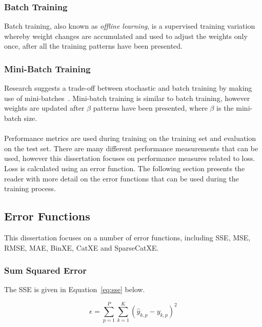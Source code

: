 \subsubsection{Batch Training}\label{sec:anns:training:batch}

Batch training, also known as \textit{offline learning}, is a supervised training variation whereby weight changes are accumulated and used to adjust the weights only once, after all the training patterns have been presented.


\subsubsection{Mini-Batch Training}\label{sec:anns:training:mini_batch}

Research suggests a trade-off between stochastic and batch training by making use of mini-batches~\cite{ref:bengio:2012}. Mini-batch training is similar to batch training, however weights are updated after $\beta$ patterns have been presented, where $\beta$ is the mini-batch size.\\
\\
\noindent
Performance metrics are used during training on the training set and evaluation on the test set. There are many different performance measurements that can be used, however this dissertation focuses on performance measures related to loss. Loss is calculated using an error function. The following section presents the reader with more detail on the error functions that can be used during the training process.

\subsection{Error Functions}\label{sec:anns:training:error_functions}

This dissertation focuses on a number of error functions, including \acf{SSE}, \acf{MSE}, \acf{RMSE}, \acf{MAE}, \acf{BinXE}, \acf{CatXE} and \acf{SparseCatXE}.


\subsubsection{Sum Squared Error}\label{sec:anns:training:error_functions:sse}

The \acs{SSE} is given in Equation~\eqref{eq:sse} below.

\begin{equation}
      \epsilon = \sum_{p=1}^P \sum_{k=1}^K (\hat{y}_{k,p} - y_{k,p})^2
      \label{eq:sse}
\end{equation}

